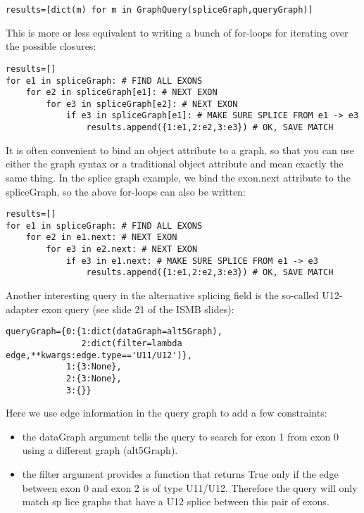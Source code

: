 \documentclass{howto}
\begin{document}
\begin{verbatim}
results=[dict(m) for m in GraphQuery(spliceGraph,queryGraph)]
\end{verbatim}

This is more or less equivalent to writing a bunch of for-loops for iterating over the possible closures:

\begin{verbatim}
results=[]
for e1 in spliceGraph: # FIND ALL EXONS
    for e2 in spliceGraph[e1]: # NEXT EXON
        for e3 in spliceGraph[e2]: # NEXT EXON
            if e3 in spliceGraph[e1]: # MAKE SURE SPLICE FROM e1 -> e3
                results.append({1:e1,2:e2,3:e3}) # OK, SAVE MATCH
\end{verbatim}

It is often convenient to bind an object attribute to a graph, so that you can use either the graph syntax or a traditional object attribute and mean exactly the same thing.  In the splice graph example, we bind the exon.next attribute to the spliceGraph, so the above for-loops can also be written:

\begin{verbatim}
results=[]
for e1 in spliceGraph: # FIND ALL EXONS
    for e2 in e1.next: # NEXT EXON
        for e3 in e2.next: # NEXT EXON
            if e3 in e1.next: # MAKE SURE SPLICE FROM e1 -> e3
                results.append({1:e1,2:e2,3:e3}) # OK, SAVE MATCH
\end{verbatim}

Another interesting query in the alternative splicing field is the so-called U12-adapter exon query (see slide 21 of the ISMB slides):

\begin{verbatim}
queryGraph={0:{1:dict(dataGraph=alt5Graph),
               2:dict(filter=lambda edge,**kwargs:edge.type=='U11/U12')},
            1:{3:None},
            2:{3:None},
            3:{}}
\end{verbatim}

Here we use edge information in the query graph to add a few constraints:

\begin{itemize}
\item
the dataGraph argument tells the query to search for exon 1 from exon 0 using a different graph (alt5Graph).

\item    
the filter argument provides a function that returns True only if the edge between exon 0 and exon 2 is of type U11/U12.  Therefore the query will only match sp
lice graphs that have a U12 splice between this pair of exons.

\end{itemize}
\end{document}
